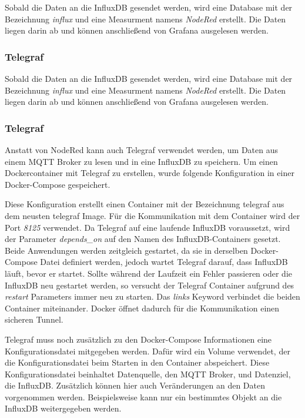 \documentclass[a4paper, 12pt, oneside, toc=listofnumbered, bibliography=totoc]{scrbook}
\begin{document}
			Sobald die Daten an die InfluxDB gesendet werden, wird eine Database mit der Bezeichnung \textit{influx} und eine Measurment namens \textit{NodeRed} erstellt. Die Daten liegen darin ab und können anschließend von Grafana ausgelesen werden.
			
			\subsubsection{Telegraf}
		
				Sobald die Daten an die InfluxDB gesendet werden, wird eine Database mit der Bezeichnung \textit{influx} und eine Measurment namens \textit{NodeRed} erstellt. Die Daten liegen darin ab und können anschließend von Grafana ausgelesen werden.
			
			\subsubsection{Telegraf}
			
			Anstatt von NodeRed kann auch Telegraf verwendet werden, um Daten aus einem MQTT Broker zu lesen und in eine InfluxDB zu speichern. Um einen Dockercontainer mit Telegraf zu erstellen, wurde folgende Konfiguration in einer Docker-Compose gespeichert.
			
			
			
			Diese Konfiguration erstellt einen Container mit der Bezeichnung telegraf aus dem neusten telegraf Image. Für die Kommunikation mit dem Container wird der Port \textit{8125} verwendet. Da Telegraf auf eine laufende InfluxDB voraussetzt, wird der Parameter \textit{depends\_on} auf den Namen des InfluxDB-Containers gesetzt. Beide Anwendungen werden zeitgleich gestartet, da sie in derselben Docker-Compose Datei definiert werden, jedoch wartet Telegraf darauf, dass InfluxDB läuft, bevor er startet. Sollte während der Laufzeit ein Fehler passieren oder die InfluxDB neu gestartet werden, so versucht der Telegraf Container aufgrund des \textit{restart} Parameters immer neu zu starten. Das \textit{links} Keyword verbindet die beiden Container miteinander. Docker öffnet dadurch für die Kommunikation einen sicheren Tunnel.
			
			Telegraf muss noch zusätzlich zu den Docker-Compose Informationen eine Konfigurationsdatei mitgegeben werden. Dafür wird ein Volume verwendet, der die Konfigurationsdatei beim Starten in den Container abspeichert. Diese Konfigurationsdatei beinhaltet Datenquelle, den MQTT Broker, und Datenziel, die InfluxDB. Zusätzlich können hier auch Veränderungen an den Daten vorgenommen werden. Beispielsweise kann nur ein bestimmtes Objekt an die InfluxDB weitergegeben werden. 
			
\end{document}

